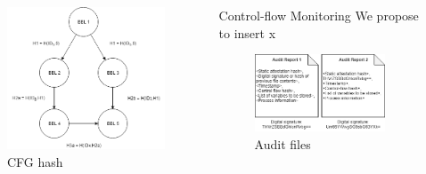 \documentclass[final]{beamer}
\newlength{\onecolwid}
\newlength{\twocolwid}
\begin{document}
\begin{frame}[t]
\begin{columns}[t]
\begin{column}{\twocolwid}
\begin{columns}[t,totalwidth=\twocolwid]
\begin{column}{\onecolwid}
\begin{figure}
\includegraphics[width=\linewidth]{images/CFGhash.png}
\caption{CFG hash}
\vspace{-1cm}
\end{figure}

\end{column} %


\begin{column}{\onecolwid}\vspace{-.6in} %

\begin{block}{Control-flow Monitoring}
We propose to insert x
\end{block}

\begin{figure}
\includegraphics[width=\linewidth]{images/Files.png}
\caption{Audit files}
\vspace{-1cm}
\end{figure}


\end{column}
\end{columns}
\end{column}
\end{columns}
\end{frame}
\end{document}
